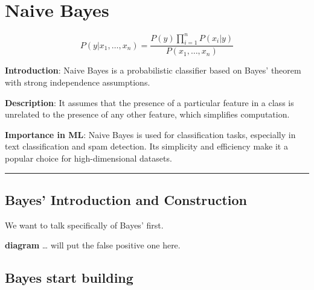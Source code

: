 \documentclass[
  12 pt,
  a4paper,
]{book}
\numberwithin{equation}{section}
\theoremstyle{plain}      %
\theoremstyle{definition} %
\theoremstyle{remark}     %
\theoremstyle{note}         %
\begin{document}
\newpage

\hypertarget{naive-bayes}{%
\chapter{Naive Bayes}\label{naive-bayes}}

\[
P(y | x_1, \ldots, x_n) = \frac{P(y) \prod_{i=1}^{n} P(x_i | y)}{P(x_1, \ldots, x_n)}
\]

\textbf{Introduction}: Naive Bayes is a probabilistic classifier based
on Bayes' theorem with strong independence assumptions.

\textbf{Description}: It assumes that the presence of a particular
feature in a class is unrelated to the presence of any other feature,
which simplifies computation.

\textbf{Importance in ML}: Naive Bayes is used for classification tasks,
especially in text classification and spam detection. Its simplicity and
efficiency make it a popular choice for high-dimensional datasets.

\begin{center}\rule{0.5\linewidth}{0.5pt}\end{center}

\hypertarget{bayes-introduction-and-construction}{%
\section{Bayes' Introduction and
Construction}\label{bayes-introduction-and-construction}}

We want to talk specifically of Bayes' first.

\textbf{diagram} \ldots{} will put the false positive one here.

\hypertarget{bayes-start-building}{%
\section{Bayes start building}\label{bayes-start-building}}
\end{document}
